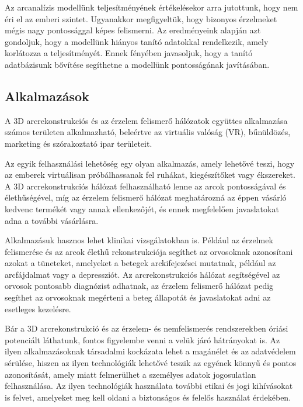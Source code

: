 \documentclass[12pt,a4]{article}
\begin{document}
        Az arcanalízis modellünk teljesítményének értékelésekor arra jutottunk, hogy nem éri el az emberi szintet. Ugyanakkor megfigyeltük, hogy bizonyos érzelmeket mégis nagy pontossággal képes felismerni. Az eredményeink alapján azt gondoljuk, hogy a modellünk hiányos tanító adatokkal rendelkezik, amely korlátozza a teljesítményét. Ennek fényében javasoljuk, hogy a tanító adatbázisunk bővítése segíthetne a modellünk pontosságának javításában.
    
        \subsection{Alkalmazások}

        A 3D arcrekonstrukciós és az érzelem felismerő hálózatok együttes alkalmazása számos területen alkalmazható, beleértve az virtuális valóság (VR), bűnüldözés, marketing és szórakoztató ipar területeit. 
        
        Az egyik felhasználási lehetőség egy olyan alkalmazás, amely lehetővé teszi, hogy az emberek virtuálisan próbálhassanak fel ruhákat, kiegészítőket vagy ékszereket. A 3D arcrekonstrukciós hálózat felhasználható lenne az arcok pontosságával és élethűségével, míg az érzelem felismerő hálózat meghatározná az éppen vásárló kedvenc termékét vagy annak ellenkezőjét, és ennek megfelelően javaslatokat adna a további vásárlásra.

        Alkalmazásuk hasznos lehet klinikai vizsgálatokban is.
        Például az érzelmek felismerése és az arcok élethű rekonstrukciója segíthet az orvosoknak azonosítani azokat a tüneteket, amelyeket a betegek arckifejezései mutatnak, például az arcfájdalmat vagy a depressziót. Az arcrekonstrukciós hálózat segítségével az orvosok pontosabb diagnózist adhatnak, az érzelem felismerő hálózat pedig segíthet az orvosoknak megérteni a beteg állapotát és javaslatokat adni az esetleges kezelésre.

        Bár a 3D arcrekonstrukció és az érzelem- és nemfelismerés rendszerekben óriási potenciált láthatunk, fontos figyelembe venni a velük járó hátrányokat is. Az ilyen alkalmazásoknak társadalmi kockázata lehet a magánélet és az adatvédelem sérülése, hiszen az ilyen technológiák lehetővé teszik az egyének könnyű és pontos azonosítását, amely miatt felmerülhet a személyes adatok jogosulatlan felhasználása. Az ilyen technológiák használata további etikai és jogi kihívásokat is felvet, amelyeket meg kell oldani a biztonságos és felelős használat érdekében.
            
\end{document}
